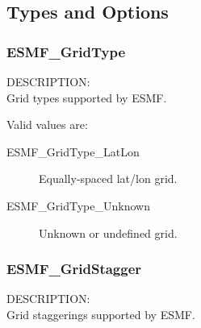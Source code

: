 
\subsection{Types and Options}

\subsubsection{ESMF\_GridType}

{\sf DESCRIPTION:\\}
Grid types supported by ESMF.

Valid values are:
\begin{description}
   \item[ESMF\_GridType\_LatLon] 
        Equally-spaced lat/lon grid.
   \item[ESMF\_GridType\_Unknown] 
        Unknown or undefined grid.

\end{description}

\subsubsection{ESMF\_GridStagger}

{\sf DESCRIPTION:\\}
Grid staggerings supported by ESMF.

